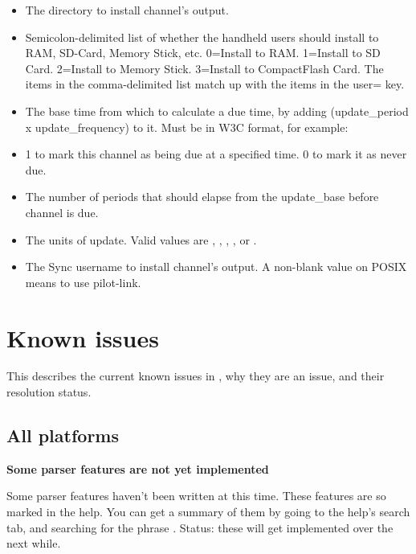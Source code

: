 \begin{helponly}
\begin{itemize}
  \item {} The directory to install channel's output.
  \item {} Semicolon-delimited list of whether
    the handheld users should install to RAM, SD-Card, Memory Stick, etc.
    0=Install to RAM. 1=Install to SD Card. 2=Install to Memory Stick.
    3=Install to CompactFlash Card.
    The items in the comma-delimited list match up with the items in the user= key.
  \item {} The base time from which to calculate a due time,
    by adding (update\_period x update\_frequency) to it. Must be in W3C
    format, for example: 
  \item {} 1 to mark this channel as being due at a
    specified time. 0 to mark it as never due.
  \item {} The number of periods that should elapse
    from the update\_base before channel is due.
  \item {} The units of update. Valid values are
    , , , , or
    .
  \item {} The Sync username to install channel's output. A
    non-blank value on POSIX means to use pilot-link.
\end{itemize}

\section{Known issues}\label{pd-known-issues}

This describes the current known issues in \brandingapplicationdesktopname, why they are an issue,
and their resolution status.

\subsection{All platforms}\label{pd-known-issues-all-platforms}

\bf{Some parser features are not yet implemented}

Some parser features haven't been written at this time. These features are so marked
in the \brandingapplicationdesktopname help. You can get a summary of them by going to the help's
search tab, and searching for the phrase . Status:
these will get implemented over the next while.


\end{helponly}
